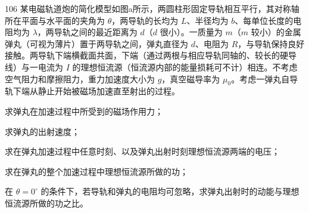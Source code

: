\begin{problem}[2019年第36届全国中学生物理竞赛复赛][电磁轨道炮简化模型]{106}
某电磁轨道炮的简化模型如图a所示，两圆柱形固定导轨相互平行，其对称轴所在平面与水平面的夹角为 $\theta$，两导轨的长均为 $L$、半径均为 $b$、每单位长度的电阻均为 $\lambda$，两导轨之间的最近距离为 $d$（$d$ 很小）。一质量为 $m$（$m$ 较小）的金属弹丸（可视为薄片）置于两导轨之间，弹丸直径为 $d$、电阻为 $R$，与导轨保持良好接触。两导轨下端横截面共面，下端（通过两根与相应导轨同轴的、较长的硬导线）与一电流为 $I$ 的理想恒流源（恒流源内部的能量损耗可不计）相连。不考虑空气阻力和摩擦阻力，重力加速度大小为 $g$，真空磁导率为 $\mu_{0}$。考虑一弹丸自导轨下端从静止开始被磁场加速直至射出的过程。
\begin{subproblem}
求弹丸在加速过程中所受到的磁场作用力；
\end{subproblem}
\begin{subproblem}
求弹丸的出射速度；
\end{subproblem}
\begin{subproblem}
求在弹丸加速过程中任意时刻、以及弹丸出射时刻理想恒流源两端的电压；
\end{subproblem}
\begin{subproblem}
求在弹丸的整个加速过程中理想恒流源所做的功；
\end{subproblem}
\begin{subproblem}
在 $\theta = 0^{\circ}$ 的条件下，若导轨和弹丸的电阻均可忽略，求弹丸出射时的动能与理想恒流源所做的功之比。
\end{subproblem}
\end{problem}